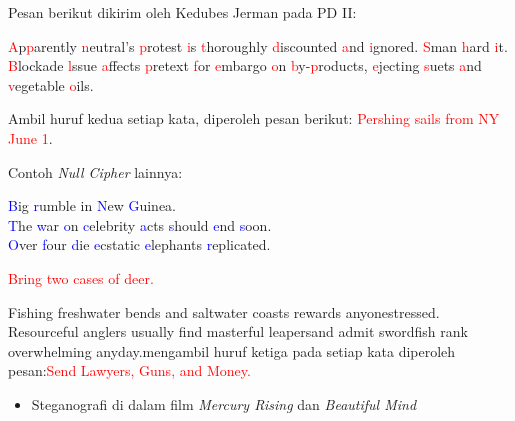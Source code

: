 \documentclass{article}
\begin{document}
Pesan berikut dikirim oleh Kedubes Jerman pada PD II:

\textcolor{red}{A}p\textcolor{red}{p}arently \textcolor{red}{n}eutral's \textcolor{red}{p}rotest \textcolor{red}{i}s \textcolor{red}{t}horoughly \textcolor{red}{d}iscounted \textcolor{red}{a}nd \textcolor{red}{i}gnored. \textcolor{red}{S}man \textcolor{red}{h}ard \textcolor{red}{i}t. \textcolor{red}{B}lockade \textcolor{red}{l}ssue \textcolor{red}{a}ffects \textcolor{red}{p}retext \textcolor{red}{f}or \textcolor{red}{e}mbargo \textcolor{red}{o}n \textcolor{red}{b}y-\textcolor{red}{p}roducts, \textcolor{red}{e}jecting \textcolor{red}{s}uets \textcolor{red}{a}nd \textcolor{red}{v}egetable \textcolor{red}{o}ils.

Ambil huruf kedua setiap kata, diperoleh pesan berikut: \textcolor{red}{Pershing sails from NY June 1}.

\newpage


Contoh \textit{Null Cipher} lainnya:

\textcolor{blue}{B}ig \textcolor{blue}{r}umble in \textcolor{blue}{N}ew \textcolor{blue}{G}uinea.\\
\textcolor{blue}{T}he \textcolor{blue}{w}ar \textcolor{blue}{o}n \textcolor{blue}{c}elebrity \textcolor{blue}{a}cts \textcolor{blue}{s}hould \textcolor{blue}{e}nd \textcolor{blue}{s}oon.\\
\textcolor{blue}{O}ver \textcolor{blue}{f}our \textcolor{blue}{d}ie \textcolor{blue}{e}cstatic \textcolor{blue}{e}lephants \textcolor{blue}{r}eplicated.

\vspace{5mm}

\textcolor{red}{Bring two cases of deer.}

\newpage


Fishing freshwater bends and saltwater coasts rewards anyone\nfeeling stressed. Resourceful anglers usually find masterful leapers\nfun and admit swordfish rank overwhelming anyday.\n\nDengan mengambil huruf ketiga pada setiap kata diperoleh pesan\nberikut:\n\n\textcolor{red}{Send Lawyers, Guns, and Money.}

\newpage


\begin{itemize}
  \item Steganografi di dalam film \textit{Mercury Rising} dan \textit{Beautiful Mind}
\end{itemize}
\end{document}
